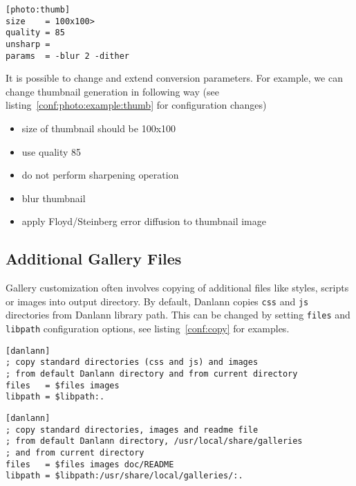 \documentclass{article}
\begin{document}
\begin{listing}
\begin{lstlisting}
[photo:thumb]
size    = 100x100>
quality = 85
unsharp =
params  = -blur 2 -dither
\end{lstlisting}
\caption{Example of custom photo conversion parameters}\label{conf:photo:example:thumb}
\end{listing}

It is possible to change and extend conversion parameters. For example, we
can change thumbnail generation in following way (see
listing~\ref{conf:photo:example:thumb} for configuration changes)
\begin{itemize}
\item size of thumbnail should be 100x100
\item use quality 85
\item do not perform sharpening operation
\item blur thumbnail 
\item apply Floyd/Steinberg error diffusion to thumbnail image
\end{itemize}

\subsection{Additional Gallery Files}\label{files}
Gallery customization often involves copying of additional files like
styles, scripts or images into output directory. By default, Danlann copies
\texttt{css} and \texttt{js} directories from Danlann library path. This
can be changed by setting \texttt{files} and \texttt{libpath} configuration
options, see listing~\ref{conf:copy} for examples.

\begin{listing}
\begin{lstlisting}
[danlann]
; copy standard directories (css and js) and images
; from default Danlann directory and from current directory
files   = $files images
libpath = $libpath:.
\end{lstlisting}

\begin{lstlisting}
[danlann]
; copy standard directories, images and readme file
; from default Danlann directory, /usr/local/share/galleries
; and from current directory
files   = $files images doc/README
libpath = $libpath:/usr/share/local/galleries/:.
\end{lstlisting}
\caption{Configuration examples used to copy additional gallery files}\label{conf:copy}
\end{listing}
\end{document}
